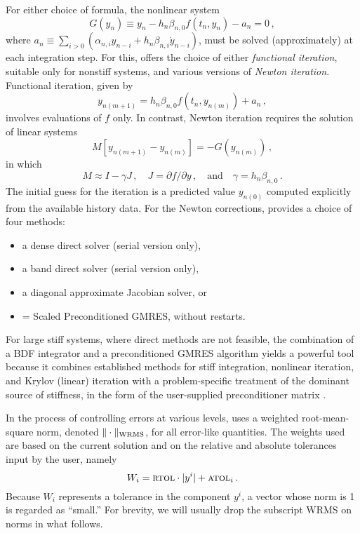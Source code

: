 For either choice of formula, the nonlinear system
\begin{equation}\label{e:nonlinear}
  G(y_n) \equiv y_n - h_n \beta_{n,0} f(t_n,y_n) - a_n = 0 \, ,
\end{equation}
where $a_n\equiv\sum_{i>0}(\alpha_{n,i}y_{n-i}+h_n\beta_{n,i}\dot{y}_{n-i})$, 
must be solved (approximately) at each integration step.  For this, {\cvode}
offers the choice of either {\em functional iteration}, suitable only
for nonstiff systems, and various versions of {\em Newton iteration}.
Functional iteration, given by
\[ y_{n(m+1)} = h_n \beta_{n,0} f(t_n,y_{n(m)}) + a_n \, , \]
involves evaluations of $f$ only.  In contrast, Newton iteration requires
the solution of linear systems
\begin{equation}\label{e:Newton}
  M [y_{n(m+1)} - y_{n(m)}] = -G(y_{n(m)}) \, ,
\end{equation}
in which
\begin{equation}\label{e:Newtonmat} 
  M \approx I - \gamma J \, ,
  \quad J = \partial f / \partial y \, ,
  \quad \mbox{and} \quad
  \gamma = h_n \beta_{n,0} \, . 
\end{equation}
The initial guess for the iteration is a predicted value $y_{n(0)}$
computed explicitly from the available history data.
For the Newton corrections, {\cvode} provides a choice of four methods:
\begin{itemize}
\item a dense direct solver (serial version only),
\item a band direct solver (serial version only),
\item a diagonal approximate Jacobian solver, or
\item {\spgmr} = Scaled Preconditioned GMRES, without restarts.
\end{itemize}
For large stiff systems, where direct methods are not feasible, the
combination of a BDF integrator and a preconditioned GMRES algorithm
yields a powerful tool because it combines established methods for
stiff integration, nonlinear iteration, and Krylov (linear) iteration
with a problem-specific treatment of the dominant source of stiffness,
in the form of the user-supplied preconditioner matrix \cite{BrHi:89}.

In the process of controlling errors at various levels, {\cvode} uses a
weighted root-mean-square norm, denoted 
$\|\cdot\|_{\mbox{\scriptsize WRMS}}$, for all 
error-like quantities.  The weights used are based on the current
solution and on the relative and absolute tolerances input by the
user, namely
\begin{equation}\label{e:errwt}
 W_i = \mbox{\sc rtol} \cdot |y^i| + \mbox{\sc atol}_i \, .
\end{equation}
Because $W_i$ represents a tolerance in the component $y^i$, a vector
whose norm is 1 is regarded as ``small.''  For brevity, we will
usually drop the subscript WRMS on norms in what follows.

